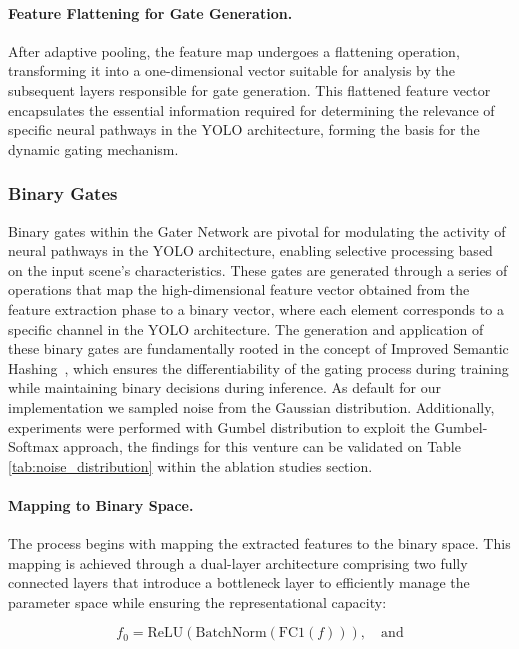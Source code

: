 \paragraph{Feature Flattening for Gate Generation.} After adaptive pooling, the feature map undergoes a flattening operation, transforming it into a one-dimensional vector suitable for analysis by the subsequent layers responsible for gate generation. This flattened feature vector encapsulates the essential information required for determining the relevance of specific neural pathways in the YOLO architecture, forming the basis for the dynamic gating mechanism.

\subsubsection{Binary Gates}
Binary gates within the Gater Network are pivotal for modulating the activity of neural pathways in the YOLO architecture, enabling selective processing based on the input scene's characteristics. These gates are generated through a series of operations that map the high-dimensional feature vector obtained from the feature extraction phase to a binary vector, where each element corresponds to a specific channel in the YOLO architecture. The generation and application of these binary gates are fundamentally rooted in the concept of Improved Semantic Hashing~\cite{kaiser2018discrete,chen2019you}, which ensures the differentiability of the gating process during training while maintaining binary decisions during inference. As default for our implementation we sampled noise from the Gaussian distribution. Additionally, experiments were performed with Gumbel distribution to exploit the Gumbel-Softmax approach, the findings for this venture can be validated on Table \ref{tab:noise_distribution} within the ablation studies section.

\paragraph{Mapping to Binary Space.} The process begins with mapping the extracted features to the binary space. This mapping is achieved through a dual-layer architecture comprising two fully connected layers that introduce a bottleneck layer to efficiently manage the parameter space while ensuring the representational capacity:

\begin{equation}
f_0 = \text{ReLU}(\text{BatchNorm}(\text{FC1}(f))), \quad \text{and}
\label{eq:bottleneck_mapping}
\end{equation}

